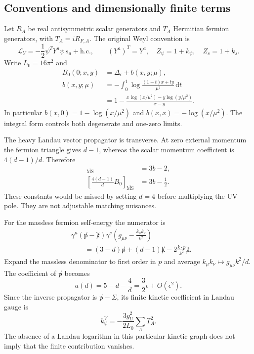 \documentclass[11pt]{article}
\newcommand{\MS}{\overline{\mathrm{MS}}}
\newcommand{\dd}{\mathrm d}
\begin{document}
\subsection{Conventions and dimensionally finite terms}
Let $R_A$ be real antisymmetric scalar generators and $T_A$ Hermitian
fermion generators, with $T_A=iR_{F,A}$. The original Weyl convention is
\begin{equation}
 \mathcal L_Y=-\frac12\psi^TY^a\psi\,s_a+\mathrm{h.c.},\qquad
 (Y^a)^T=Y^a,\quad Z_\psi=1+k_\psi,\quad Z_s=1+k_s.
\end{equation}
Write $L_0=16\pi^2$ and
\begin{align}
 B_0(0;x,y)&=\Delta_\epsilon+b(x,y;\mu),\\
 b(x,y;\mu)&=-\int_0^1\log\frac{(1-t)x+ty}{\mu^2}\,\dd t\nonumber\\
 &=1-\frac{x\log(x/\mu^2)-y\log(y/\mu^2)}{x-y}.
\end{align}
In particular $b(x,0)=1-\log(x/\mu^2)$ and $b(x,x)=-\log(x/\mu^2)$.
The integral form controls both degenerate and one-zero limits.

The heavy Landau vector propagator is transverse. At zero external
momentum the fermion triangle gives $d-1$, whereas the scalar momentum
coefficient is $4(d-1)/d$. Therefore
\begin{align}
 [(d-1)B_0]_{\MS}&=3b-2,\\
 \left[\frac{4(d-1)}{d}B_0\right]_{\MS}&=3b-\frac12.
\end{align}
These constants would be missed by setting $d=4$ before multiplying the
UV pole. They are not adjustable matching nuisances.

For the massless fermion self-energy the numerator is
\begin{align}
 &\gamma^\mu(\not p-\not k)\gamma^\nu
 \left(g_{\mu\nu}-\frac{k_\mu k_\nu}{k^2}\right)\nonumber\\
 &\qquad=(3-d)\not p+(d-1)\not k
            -2\frac{k\cdot p}{k^2}\not k.
\end{align}
Expand the massless denominator to first order in $p$ and average
$k_\mu k_\nu\mapsto g_{\mu\nu}k^2/d$. The coefficient of $\not p$ becomes
\begin{equation}
 a(d)=5-d-\frac4d=\frac32\epsilon+O(\epsilon^2).
\end{equation}
Since the inverse propagator is $\not p-\Sigma$, its finite kinetic
coefficient in Landau gauge is
\begin{equation}\label{eq:kpsi}
 k_\psi^{V}=-\frac{3g_U^2}{2L_0}\sum_A T_A^2.
\end{equation}
The absence of a Landau logarithm in this particular kinetic graph does
not imply that the finite contribution vanishes.
\end{document}
